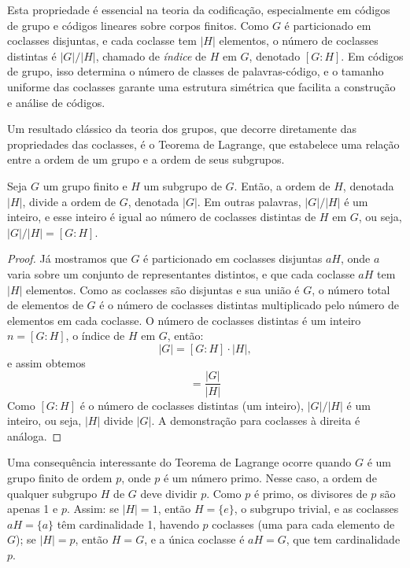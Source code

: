\begin{remark}
Esta propriedade é essencial na teoria da codificação, especialmente em códigos
de grupo e códigos lineares sobre corpos finitos. Como $G$ é particionado em
coclasses disjuntas, e cada coclasse tem $|H|$ elementos, o número de
coclasses distintas é $|G|/|H|$, chamado de \emph{índice} de $H$ em $G$,
denotado $[G:H]$. Em códigos de grupo, isso determina o número de classes de
palavras-código, e o tamanho uniforme das coclasses garante uma estrutura
simétrica que facilita a construção e análise de códigos.
\end{remark}





Um resultado clássico da teoria dos grupos, que decorre diretamente das
propriedades das coclasses, é o Teorema de Lagrange, que estabelece uma relação
entre a ordem de um grupo e a ordem de seus subgrupos.

\begin{theorem}
Seja $G$ um grupo finito e $H$ um subgrupo de $G$. Então, a ordem de $H$,
denotada $|H|$, divide a ordem de $G$, denotada $|G|$. Em outras palavras,
$|G|/|H|$ é um inteiro, e esse inteiro é igual ao número de coclasses
distintas de $H$ em $G$, ou seja, $|G|/|H| = [G:H]$.
\end{theorem}

\begin{proof}
Já mostramos que $G$ é particionado em coclasses disjuntas $aH$, onde $a$ varia
sobre um conjunto de representantes distintos, e que cada coclasse $aH$ tem
$|H|$ elementos. Como as coclasses são disjuntas e sua união é $G$, o número
total de elementos de $G$ é o número de coclasses distintas multiplicado pelo
número de elementos em cada coclasse. O número de coclasses distintas é
um inteiro $n = [G:H]$, o índice de $H$ em $G$, então:
\begin{equation}
|G| = [G:H] \cdot |H| ,
\end{equation}
e assim obtemos
\begin{equation}
[G:H] = \frac{|G|}{|H|}
\end{equation}
Como $[G:H]$ é o número de coclasses distintas (um inteiro), $|G|/|H|$ é um
inteiro, ou seja, $|H|$ divide $|G|$. A demonstração para coclasses à direita
é análoga.
\end{proof}

\begin{remark}
Uma consequência interessante do Teorema de Lagrange ocorre quando $G$ é um
grupo finito de ordem $p$, onde $p$ é um número primo. Nesse caso, a ordem de
qualquer subgrupo $H$ de $G$ deve dividir $p$. Como $p$ é primo, os divisores
de $p$ são apenas 1 e $p$. Assim:
se $|H| = 1$, então $H = \{e\}$, o subgrupo trivial, e as coclasses
$aH = \{a\}$ têm cardinalidade 1, havendo $p$ coclasses (uma para cada elemento de $G$);
se $|H| = p$, então $H = G$, e a única coclasse é $aH = G$, que tem cardinalidade $p$.
\end{remark}


